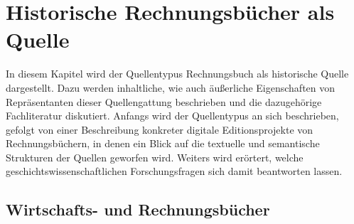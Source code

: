 \documentclass[12pt,a4paper]{article}
\begin{document}
\newpage
\section{Historische Rechnungsbücher als Quelle}
\label{ref:Rechnung}

In diesem Kapitel wird der Quellentypus Rechnungsbuch als historische Quelle dargestellt. Dazu werden inhaltliche, wie auch äußerliche Eigenschaften von Repräsentanten dieser Quellengattung beschrieben und die dazugehörige Fachliteratur diskutiert.
Anfangs wird der Quellentypus an sich beschrieben, gefolgt von einer Beschreibung konkreter digitale Editionsprojekte von Rechnungsbüchern, in denen ein Blick auf die textuelle und semantische Strukturen der Quellen geworfen wird. Weiters wird erörtert, welche geschichtswissenschaftlichen Forschungsfragen sich damit beantworten lassen.

\subsection{Wirtschafts- und Rechnungsbücher}
\end{document}
